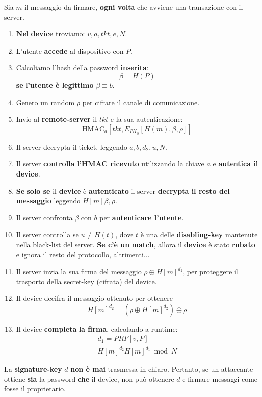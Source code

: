 \begin{corollary}\label{def:retrboost}
Sia $m$ il messaggio da firmare, \textbf{ogni volta} che avviene una transazione con il server.
\begin{enumerate}
    \item \textbf{Nel device} troviamo: $v,a,tkt,e,N$.
    \item L'utente \textbf{accede} al dispositivo con $P$.
    \item Calcoliamo l'hash della password \textbf{inserita}:\[\beta=H(P)\]
    \textbf{se l'utente è legittimo} $\beta\equiv b$.
    \item Genero un random $\rho$ per cifrare il canale di comunicazione.
    \item Invio al \textbf{remote-server} il $tkt$ e la sua autenticazione:
    \[\text{HMAC}_a[tkt, E_{PK_S}[H(m),\beta,\rho]]\]
    \item Il server decrypta il ticket, leggendo $a,b,d_2,u,N$.
    \item Il server \textbf{controlla l'HMAC ricevuto} utilizzando la chiave $a$ e \textbf{autentica il device}.
    \item \textbf{Se solo se} il \textbf{device} è \textbf{autenticato} il server \textbf{decrypta il resto del messaggio} leggendo $H[m]\beta,\rho$.
    \item Il server confronta $\beta$ con $b$ per \textbf{autenticare l'utente}.
    \item Il server controlla se $u\ne{H(t)}$, dove $t$ è una delle \textbf{disabling-key} mantenute nella black-list del server. \textbf{Se c'è un match}, allora il \textbf{device} è stato \textbf{rubato} e ignora il resto del protocollo, altrimenti...
    \item Il server invia la sua firma del messaggio $\rho\oplus H[m]^{d_2}$, per proteggere il trasporto della secret-key (cifrata) del device.
    \item Il device decifra il messaggio ottenuto per ottenere \[H[m]^{d_2}=(\rho\oplus H[m]^{d_2})\oplus \rho\]
    \item Il device \textbf{completa la firma}, calcolando a runtime:
    \begin{align*}
        d_1=PRF[v,P]\\
        H[m]^{d_2}H[m]^{d_1}\bmod{N}
    \end{align*}
    \end{enumerate}
\end{corollary}
\begin{note}
La \textbf{signature-key} $d$ \textbf{non è mai} trasmessa in chiaro. Pertanto, se un attaccante ottiene \textbf{sia} la password \textbf{che} il device, non può ottenere $d$ e firmare messaggi come fosse il proprietario.
\end{note}
